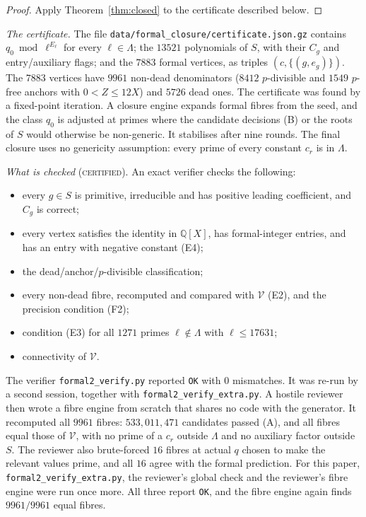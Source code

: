 \documentclass[11pt,reqno]{amsart}
\theoremstyle{definition}
\newcommand{\Q}{\mathbb Q}
\newcommand{\cV}{\mathcal V}
\newcommand{\status}[1]{\textsc{#1}}
\begin{document}
\begin{proof}
Apply Theorem~\ref{thm:closed} to the certificate described below.
\end{proof}

\emph{The certificate.}  The file \texttt{data/formal\_closure/certificate.json.gz}
contains $q_0\bmod\ell^{E_\ell}$ for every $\ell\in\Lambda$; the $13521$
polynomials of $S$, with their $C_g$ and entry/auxiliary flags; and the
$7883$ formal vertices, as triples $(c,\{(g,e_g)\})$.  The $7883$ vertices
have $9961$ non-dead denominators ($8412$ $p$-divisible and $1549$ $p$-free
anchors with $0<Z\le12X$) and $5726$ dead ones.  The certificate was found
by a fixed-point iteration.  A closure engine expands formal fibres from
the seed, and the class $q_0$ is adjusted at primes where the candidate
decisions (B) or the roots of $S$ would otherwise be non-generic.  It
stabilises after nine rounds.  The final closure uses no genericity
assumption: every prime of every constant $c_r$ is in $\Lambda$.

\emph{What is checked} (\status{certified}).  An exact verifier checks the
following:
\begin{itemize}
\item every $g\in S$ is primitive, irreducible and has positive leading
coefficient, and $C_g$ is correct;
\item every vertex satisfies the identity in $\Q[X]$, has formal-integer
entries, and has an entry with negative constant (E4);
\item the dead/anchor/$p$-divisible classification;
\item every non-dead fibre, recomputed and compared with $\cV$ (E2), and
the precision condition (F2);
\item condition (E3) for all $1271$ primes $\ell\notin\Lambda$ with
$\ell\le17631$;
\item connectivity of $\cV$.
\end{itemize}
The verifier \texttt{formal2\_verify.py} reported \texttt{OK} with $0$
mismatches.  It was re-run by a second session, together with
\texttt{formal2\_verify\_extra.py}.  A hostile reviewer then wrote a fibre
engine from scratch that shares no code with the generator.  It recomputed
all $9961$ fibres: $533{,}011{,}471$ candidates passed (A), and all fibres
equal those of $\cV$, with no prime of a $c_r$ outside $\Lambda$ and no
auxiliary factor outside $S$.  The reviewer also brute-forced $16$ fibres at
actual $q$ chosen to make the relevant values prime, and all $16$ agree with
the formal prediction.  For this paper, \texttt{formal2\_verify\_extra.py},
the reviewer's global check and the reviewer's fibre engine were run once
more.  All three report \texttt{OK}, and the fibre engine again finds
$9961/9961$ equal fibres.
\end{document}
